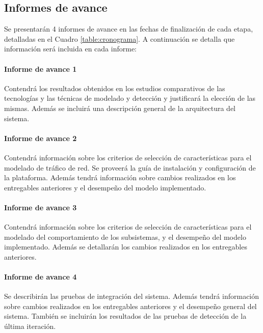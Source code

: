 \subsection*{Informes de avance}

Se presentarán 4 informes de avance en las fechas de finalización de cada etapa, detalladas en el Cuadro \ref{table:cronograma}. A continuación se detalla que información será incluida en cada informe:

\paragraph{Informe de avance 1} 
Contendrá los resultados obtenidos en los estudios comparativos de las tecnologías y las técnicas de modelado y detección y justificará la elección de las mismas. Además se incluirá una descripción general de la arquitectura del sistema.

\paragraph{Informe de avance 2}
Contendrá información sobre los criterios de selección de características para el modelado de tráfico de red. Se proveerá la guía de instalación y configuración de la plataforma. Además tendrá información sobre cambios realizados en los entregables anteriores y el desempeño del modelo implementado.

\paragraph{Informe de avance 3}
Contendrá información sobre los criterios de selección de características para el modelado del comportamiento de los subsistemas, y el desempeño del modelo implementado. Además se detallarán los cambios realizados en los entregables anteriores.

\paragraph{Informe de avance 4}
Se describirán las pruebas de integración del sistema. Además tendrá información sobre cambios realizados en los entregables anteriores y el desempeño general del sistema. También se incluirán los resultados de las pruebas de detección de la última iteración.

